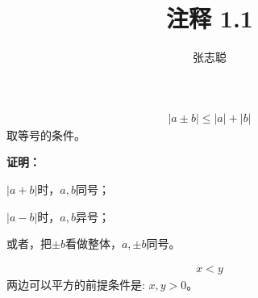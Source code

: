 \documentclass{article}
\begin{document}
\title{注释 1.1}
\author{张志聪}
\maketitle

\begin{zremark}
  \begin{align*}
    |a \pm b| \leq |a| + |b|
  \end{align*}
  取等号的条件。
\end{zremark}

\textbf{证明：}

$|a + b|$时，$a, b$同号；

$|a - b|$时，$a, b$异号；


或者，把$\pm b$看做整体，$a, \pm b$同号。

\begin{zremark}
  \begin{align*}
    x < y
  \end{align*}
  两边可以平方的前提条件是: $x, y > 0$。
\end{zremark}
\end{document}
